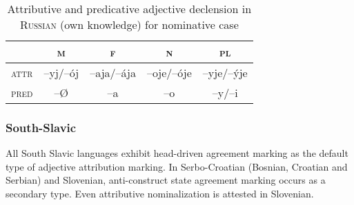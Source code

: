 \begin{table}[h]
\begin{center}
\begin{footnotesize}
\begin{tabular}[t]{l|c c c c}
\hline
\hline
			&\textsc{m}	&\textsc{f}		&\textsc{n}	&\textsc{pl}\\
\hline
\textsc{attr}	&–yj/–ój		&–aja/–ája	&–oje/–óje	&–yje/–\'yje\\
\textsc{pred}	&–{Ø}		&–a			&–o			&–y/–i\\
			\hline
			\hline
\end{tabular}
\caption[Adjective paradigm for \textsc{Russian}]{Attributive and predicative adjective declension in \textsc{Russian} (own knowledge) for nominative case}
\label{Russian adj agr paradigm}
\end{footnotesize}
\end{center}
\end{table}

\subsubsection{South-Slavic} \label{s-slavic synchr}
All South Slavic languages exhibit head-driven agreement marking as the default type of adjective attribution marking. In Serbo-Croatian (Bosnian, Croatian and Serbian) and Slovenian, anti-construct state agreement marking occurs as a secondary type. Even attributive nominalization is attested in Slovenian.
 
